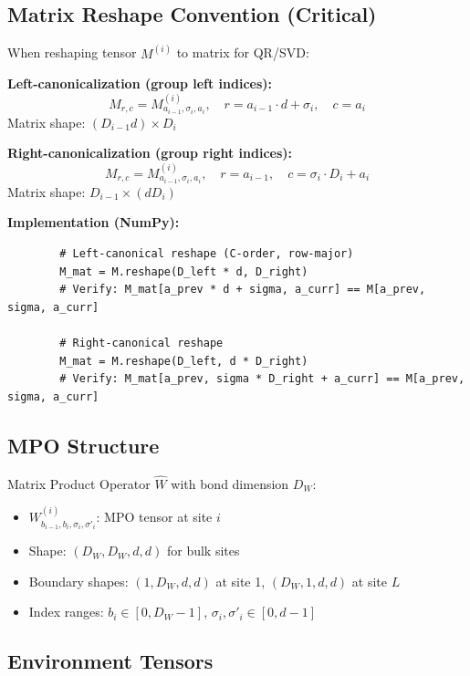 \documentclass[aps,prb,onecolumn,scriptaddress]{revtex4-2}
\begin{document}
	\subsection{Matrix Reshape Convention (Critical)}
	
	When reshaping tensor $M^{(i)}$ to matrix for QR/SVD:
	
	\textbf{Left-canonicalization (group left indices):}
	\begin{equation}
		M_{r,c} = M^{(i)}_{a_{i-1},\sigma_i,a_i}, \quad r = a_{i-1} \cdot d + \sigma_i, \quad c = a_i
	\end{equation}
	Matrix shape: $(D_{i-1}d) \times D_i$
	
	\textbf{Right-canonicalization (group right indices):}
	\begin{equation}
		M_{r,c} = M^{(i)}_{a_{i-1},\sigma_i,a_i}, \quad r = a_{i-1}, \quad c = \sigma_i \cdot D_i + a_i
	\end{equation}
	Matrix shape: $D_{i-1} \times (dD_i)$
	
	\textbf{Implementation (NumPy):}
	\begin{verbatim}
		# Left-canonical reshape (C-order, row-major)
		M_mat = M.reshape(D_left * d, D_right)
		# Verify: M_mat[a_prev * d + sigma, a_curr] == M[a_prev, sigma, a_curr]
		
		# Right-canonical reshape
		M_mat = M.reshape(D_left, d * D_right)
		# Verify: M_mat[a_prev, sigma * D_right + a_curr] == M[a_prev, sigma, a_curr]
	\end{verbatim}
	
	\subsection{MPO Structure}
	
	Matrix Product Operator $\hat{W}$ with bond dimension $D_W$:
	\begin{itemize}
		\item $W^{(i)}_{b_{i-1},b_i,\sigma_i,\sigma'_i}$: MPO tensor at site $i$
		\item Shape: $(D_W, D_W, d, d)$ for bulk sites
		\item Boundary shapes: $(1, D_W, d, d)$ at site 1, $(D_W, 1, d, d)$ at site $L$
		\item Index ranges: $b_i \in [0, D_W-1]$, $\sigma_i, \sigma'_i \in [0, d-1]$
	\end{itemize}
	
	\subsection{Environment Tensors}
	
\end{document}
